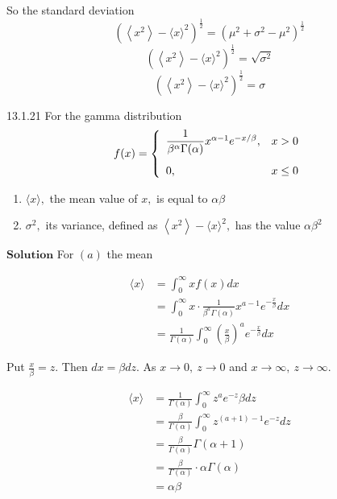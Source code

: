 So the standard deviation 
$$\left(\left\langle x^{2}\right\rangle-\langle x\rangle^{2}\right)^{\frac{1}{2}}=\left(\mu^{2}+\sigma^{2}-\mu^{2}\right)^{\frac{1}{2}}$$
$$\left(\left\langle x^{2}\right\rangle-\langle x\rangle^{2}\right)^{\frac{1}{2}}=\sqrt{\sigma^{2}}$$
$$\left(\left\langle x^{2}\right\rangle-\langle x\rangle^{2}\right)^{\frac{1}{2}}=\sigma$$


\newpage

\begin{mybox}{13.1.21}
For the gamma distribution
$$
f(x)=\left\{\begin{array}{ll}
\dfrac{1}{\beta^{\alpha} \Gamma(\alpha)} x^{\alpha-1} e^{-x / \beta}, & x>0 \vspace{3mm}\\
0, & x \leq 0
\end{array}\right.
$$
\begin{enumerate}[$(a)$]
\item $\langle x\rangle,$ the mean value of $x,$ is equal to $\alpha \beta$
\item $\sigma^{2},$ its variance, defined as $\left\langle x^{2}\right\rangle-\langle x\rangle^{2},$ has the value $\alpha \beta^{2}$
\end{enumerate}
\end{mybox}

$\boxed{\textbf{Solution}}$ For $(a)$ the mean

$$
\begin{aligned}
\langle x\rangle&=\int_{0}^{\infty} x f(x) d x \\
&=\int_{0}^{\infty} x \cdot \frac{1}{\beta^{a} \Gamma(\alpha)} x^{a-1} e^{-\frac{x}{\beta}} d x \\
&=\frac{1}{\Gamma(\alpha)} \int_{0}^{\infty}\left(\frac{x}{\beta}\right)^{a} e^{-\frac{x}{\beta}} d x 
\end{aligned}
$$

Put $\frac{x}{\beta}=z .$ Then $d x=\beta d z .$ As $x \rightarrow 0, \  z \rightarrow 0$ and $x \rightarrow \infty, \  z \rightarrow \infty$.

$$
\begin{aligned}
\langle x\rangle&=\frac{1}{\Gamma(\alpha)} \int_{0}^{\infty} z^{a} e^{-z} \beta d z \\
&=\frac{\beta}{\Gamma(\alpha)} \int_{0}^{\infty} z^{(a+1)-1} e^{-z} d z \\
&=\frac{\beta}{\Gamma(\alpha)} \Gamma(\alpha+1) \\
&=\frac{\beta}{\Gamma(\alpha)} \cdot \alpha \Gamma(\alpha) \\
&=\alpha \beta \\
\end{aligned}
$$

